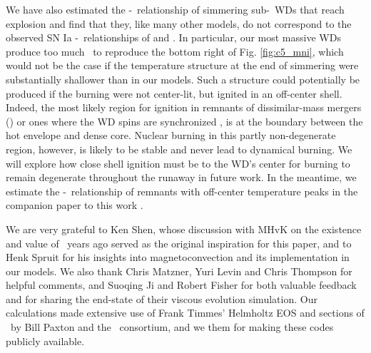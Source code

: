 
We have also estimated the \Mtot-\MNi\ relationship of simmering sub-\Mch\ WDs that reach explosion and find that they, like many other models, do not correspond to the observed SN Ia \Mtot-\MNi\ relationships of \cite{scalzrs14} and \cite{chil+15}.  In particular, our most massive WDs produce too much \Ni\ to reproduce the bottom right of Fig. \ref{fig:c5_mni}, which would not be the case if the temperature structure at the end of simmering were substantially shallower than in our models.  Such a structure could potentially be produced if {\charles the burning were not center-lit, but ignited in an off-center shell.  Indeed, the most likely region for ignition in remnants of dissimilar-mass mergers (\citeal{zhu+13}) or ones where the WD spins are synchronized \citep{rask+12, dan+14}, is at the boundary between the hot envelope and dense core.  Nuclear burning in this partly non-degenerate region, however, is likely to be stable \citep{shen+12, schw+12, schw+16} and never lead to dynamical burning.  We will explore how close shell ignition must be to the WD's center for burning to remain degenerate throughout the runaway in future work.  In the meantime, we estimate the \Mtot-\MNi\ relationship of remnants with off-center temperature peaks in the companion paper to this work \citep{herizv16}.}

\vspace{5mm}

We are very grateful to Ken Shen, whose discussion with MHvK on the existence and value of \Mcrit\ years ago served as the original inspiration for this paper, and to Henk Spruit for his insights into magnetoconvection and its implementation in our models.  We also thank Chris Matzner, Yuri Levin and Chris Thompson for helpful comments, and Suoqing Ji and Robert Fisher for both valuable feedback and for sharing the end-state of their viscous evolution simulation.  Our calculations made extensive use of Frank Timmes' Helmholtz EOS and sections of \mesa\ by Bill Paxton and the \mesa\ consortium, and we them for making these codes publicly available.  



